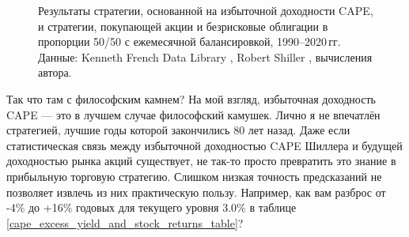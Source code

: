 \begin{figure}[ht]
\centering
{}
\caption{Результаты стратегии, основанной на избыточной доходности CAPE, и 
стратегии, покупающей акции и безрисковые облигации в пропорции 50/50 с 
ежемесячной балансировкой, 1990--2020\,гг. Данные: Kenneth French Data Library 
\cite{kennethFrench}, Robert Shiller \cite{shillerOnline}, вычисления автора.}
\label{cape_strategy_1990}
\end{figure}

Так что там с философским камнем? На мой взгляд, избыточная доходность 
CAPE --- это в лучшем случае философский камушек. Лично я не впечатлён 
стратегией, лучшие годы которой закончились 80 лет назад. Даже если 
статистическая связь между избыточной доходностью CAPE Шиллера и будущей 
доходностью рынка акций существует, не так-то просто превратить это знание 
в прибыльную торговую стратегию. Слишком низкая точность предсказаний 
не позволяет извлечь из них практическую пользу. Например, как вам разброс от 
-4\% до +16\% годовых для текущего уровня 3.0\% в таблице 
\ref{cape_excess_yield_and_stock_returns_table}?

